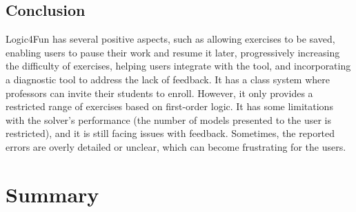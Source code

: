 \subsection{Conclusion}
Logic4Fun has several positive aspects, such as allowing exercises to be saved, enabling users to pause their work and resume it later, progressively increasing the difficulty of exercises, helping users integrate with the tool, and incorporating a diagnostic tool to address the lack of feedback. It has a class system where professors can invite their students to enroll. However, it only provides a restricted range of exercises based on first-order logic. It has some limitations with the solver's performance (the number of models presented to the user is restricted), and it is still facing issues with feedback. Sometimes, the reported errors are overly detailed or unclear, which can become frustrating for the users.


\section{Summary}